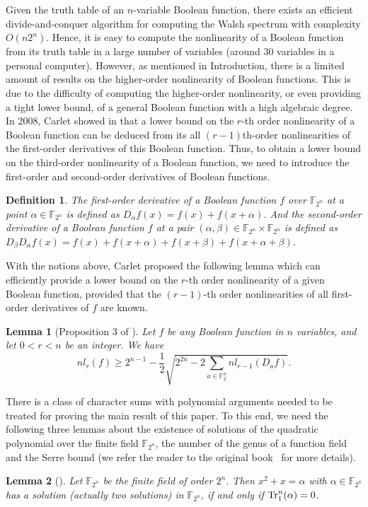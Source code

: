 \documentclass[preprint,10pt]{elsarticle}
\newcommand{\F}{\mathbb{F}}
\newcommand{\0}{\textbf{0}}
\newcommand{\1}{\textbf{1}}
\theoremstyle{plain}
\newtheorem{lemma}{Lemma}
\newtheorem{definition}{Definition}
\begin{document}
    Given the truth table of an $n$-variable Boolean function, there exists an efficient divide-and-conquer algorithm for computing the Walsh spectrum with complexity $O(n2^n)$. 
    Hence, it is easy to compute the nonlinearity of a Boolean function from its truth table in a large number of variables (around $30$ variables in a personal computer).
    However, as mentioned in Introduction, there is a limited amount of results on the higher-order nonlinearity of Boolean functions. 
    This is due to the difficulty of computing the higher-order nonlinearity, or even providing a tight lower bound, of a general Boolean function with a high algebraic degree.
    In 2008, Carlet showed in \cite{Carlet2008lowbound_NL_profile} that a lower bound on the $r$-th order nonlinearity of a Boolean function can be deduced from its all $(r-1)$th-order nonlinearities of the first-order derivatives of this Boolean function.
    Thus, to obtain a lower bound on the third-order nonlinearity of a Boolean function, we need to introduce the first-order and second-order derivatives of Boolean functions.
    \begin{definition}
        The first-order derivative of a Boolean function $f$ over $\F_{2^n}$ at a point $\alpha\in\F_{2^n}$ is defined as $D_{\alpha}f(x)=f(x)+f(x+\alpha)$.
        And the second-order derivative of a Boolean function $f$ at a pair $(\alpha,\beta)\in\F_{2^n}\times\F_{2^n}$ is defined as $D_{\beta}D_{\alpha}f(x)=f(x)+f(x+\alpha)+f(x+\beta)+f(x+\alpha+\beta)$.
    \end{definition}
    With the notions above, Carlet proposed the following lemma which can efficiently provide a lower bound on the $r$-th order nonlinearity of a given Boolean function,
    provided that the $(r-1)$-th order nonlinearities of all first-order derivatives of $f$ are known.
    \begin{lemma}[Proposition 3 of \cite{Carlet2008lowbound_NL_profile}]\label{thm:High_order_nl_bound1}
        Let $f$ be any Boolean function in $n$ variables, and let $0<r<n$ be an integer.
        We have
        \[nl_r(f)\ge 2^{n-1}-\frac{1}{2}\sqrt{2^{2n}-2\sum_{a\in\F_2^n}nl_{r-1}(D_af)}.\]
    \end{lemma}

    There is a class of character sums with polynomial arguments needed to be treated for proving the main result of this paper.
    To this end, we need the following three lemmas about the existence of solutions of the quadratic polynomial over the finite field $\F_{2^n}$, the number of the genus of a function field and the Serre bound (we refer the reader to the original book~\cite{Stichtenoth2008book_algebraicfunctionfieldsandcodes} for more details).
    \begin{lemma}[\cite{Lidl1997FiniteFieldBook}]\label{lemma:hilbert90}
        Let $\F_{2^n}$ be the finite field of order $2^n$.
        Then $x^2+x=\alpha$ with $\alpha\in\F_{2^n}$ has a solution (actually two solutions) in $\F_{2^n}$, if and only if $\Tr_1^n(\alpha)=0$.
    \end{lemma}
\end{document}
